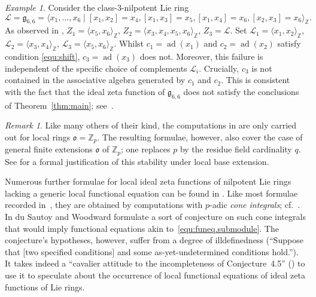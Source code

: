 \documentclass[11pt]{amsart}
\numberwithin{equation}{section}
\numberwithin{figure}{section}
\theoremstyle{plain}
\theoremstyle{definition}
\theoremstyle{remark}
\newtheorem{remark}[theorem]{Remark}
\newtheorem{example}[theorem]{Example}
\begin{document}
\begin{example}
Consider the class-$3$-nilpotent Lie ring
$${\ensuremath{\mathcal{L}}}= {\ensuremath{\mathfrak{g}}}_{6,6} = {\langle} x_1,\dots,x_6 \mid [x_1,x_2]=x_4,
[x_1,x_3]=x_5, [x_1,x_4]=x_6, [x_2,x_3]=x_6{\rangle}_{\ensuremath{\mathbb{Z}}}.$$ As observed in
\cite[Example~4.58]{duSWoodward/08}, $Z_1 = {\langle} x_5,x_6{\rangle}_{\ensuremath{\mathbb{Z}}}$, $Z_2
= {\langle} x_3,x_4,x_5,x_6{\rangle}_{\ensuremath{\mathbb{Z}}}$, $Z_3={\ensuremath{\mathcal{L}}}$. Set ${\ensuremath{\mathcal{L}}}_1 = {\langle}
x_1,x_2{\rangle}_{\ensuremath{\mathbb{Z}}}$, ${\ensuremath{\mathcal{L}}}_2 = {\langle} x_3,x_4{\rangle}_{\ensuremath{\mathbb{Z}}}$, ${\ensuremath{\mathcal{L}}}_3 = {\langle}
x_5,x_6{\rangle}_{\ensuremath{\mathbb{Z}}}$. Whilst $c_1=\operatorname{ad}(x_1)$ and $c_2 = \operatorname{ad}(x_2)$ satisfy
condition \eqref{equ:shift}, $c_3 = \operatorname{ad}(x_3)$ does not. Moreover, this
failure is independent of the specific choice of complements
${\ensuremath{\mathcal{L}}}_i$. Crucially, $c_3$ is not contained in the associative algebra
generated by $c_1$ and $c_2$. This is consistent with the fact that
the ideal zeta function of ${\ensuremath{\mathfrak{g}}}_{6,6}$ does not satisfy the
conclusions of Theorem~\ref{thm:main};
see~\cite[Theorem~2.44]{duSWoodward/08}.
\end{example}

\begin{remark}\label{rem:local.base.ext}
  Like many others of their kind, the computations in
  \cite{duSWoodward/08} are only carried out for local rings
  ${\mathfrak o}={\ensuremath{\mathbb{Z}_p}}$. The resulting formulae, however, also cover the case of
  general finite extensions ${\mathfrak o}$ of ${\ensuremath{\mathbb{Z}_p}}$; one replaces $p$ by the
  residue field cardinality $q$. See \cite[Section~3.3]{Rossmann/15a}
  for a formal justification of this stability under local base
  extension.
\end{remark}

Numerous further formulae for local ideal zeta functions of nilpotent
Lie rings lacking a generic local functional equation can be found in
\cite[Section~2]{duSWoodward/08}. Like most formulae recorded
in~\cite{duSWoodward/08}, they are obtained by computations with
$p$-adic \emph{cone integrals}; cf.\ \cite{duSG/00}.  In
\cite[Conjecture~4.5]{duSWoodward/08} du Sautoy and Woodward formulate
a sort of conjecture on such cone integrals that would imply
functional equations akin to~\eqref{equ:funeq.submodule}. The
conjecture's hypotheses, however, suffer from a degree of
illdefinedness (``Suppose that [two specified conditions] and some
as-yet-undetermined conditions hold.''). It takes indeed a ``cavalier
attitude to the incompleteness of Conjecture~4.5''
(\cite[p.~98]{duSWoodward/08}) to use it to speculate about the
occurrence of local functional equations of ideal zeta functions of
Lie rings.
\end{document}
